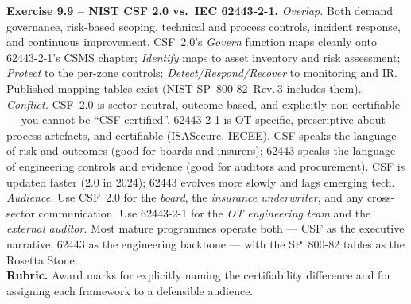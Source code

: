 \documentclass[11pt,a4paper]{article}
\begin{document}
\begin{solutionbox}
\textbf{Exercise 9.9 -- NIST CSF 2.0 vs.\ IEC 62443-2-1.}
\emph{Overlap.} Both demand governance, risk-based scoping, technical and process controls, incident response, and continuous improvement. CSF~2.0's \emph{Govern} function maps cleanly onto 62443-2-1's CSMS chapter; \emph{Identify} maps to asset inventory and risk assessment; \emph{Protect} to the per-zone controls; \emph{Detect/Respond/Recover} to monitoring and IR. Published mapping tables exist (NIST SP~800-82~Rev.\,3 includes them).
\\\emph{Conflict.} CSF~2.0 is sector-neutral, outcome-based, and explicitly non-certifiable --- you cannot be ``CSF certified''. 62443-2-1 is OT-specific, prescriptive about process artefacts, and certifiable (ISASecure, IECEE). CSF speaks the language of risk and outcomes (good for boards and insurers); 62443 speaks the language of engineering controls and evidence (good for auditors and procurement). CSF is updated faster (2.0 in 2024); 62443 evolves more slowly and lags emerging tech.
\\\emph{Audience.} Use CSF~2.0 for the \emph{board}, the \emph{insurance underwriter}, and any cross-sector communication. Use 62443-2-1 for the \emph{OT engineering team} and the \emph{external auditor}. Most mature programmes operate both --- CSF as the executive narrative, 62443 as the engineering backbone --- with the SP~800-82 tables as the Rosetta Stone.
\\\textbf{Rubric.} Award marks for explicitly naming the certifiability difference and for assigning each framework to a defensible audience.
\end{solutionbox}
\end{document}
